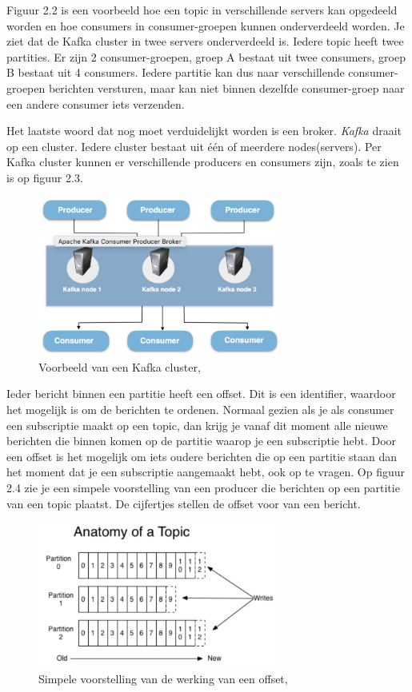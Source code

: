 Figuur 2.2 is een voorbeeld hoe een topic in verschillende servers kan opgedeeld worden en hoe consumers in consumer-groepen kunnen onderverdeeld worden. Je ziet dat de Kafka cluster in twee servers onderverdeeld is. Iedere topic heeft twee partities. Er zijn 2 consumer-groepen, groep A bestaat uit twee consumers, groep B bestaat uit 4 consumers. Iedere partitie kan dus naar verschillende consumer-groepen berichten versturen, maar kan niet binnen dezelfde consumer-groep naar een andere consumer iets verzenden. 

Het laatste woord dat nog moet verduidelijkt worden is een broker. \emph{Kafka} draait op een cluster. Iedere cluster bestaat uit één of meerdere nodes(servers). Per Kafka cluster kunnen er verschillende producers en consumers zijn, zoals te zien is op figuur 2.3. 

\begin{figure}[h!]
    \centering
    \includegraphics[width=80mm]{../kafkaCluster.png}
    \caption{Voorbeeld van een Kafka cluster, \autocite{Johansson2016}}
    
\end{figure}


 Ieder bericht binnen een partitie heeft een offset. Dit is een identifier, waardoor het mogelijk is om de berichten te ordenen. Normaal gezien als je als consumer een subscriptie maakt op een topic, dan krijg je vanaf dit moment alle nieuwe berichten die binnen komen op de partitie waarop je een subscriptie hebt. Door een offset is het mogelijk om iets oudere berichten die op een partitie staan dan het moment dat je een subscriptie aangemaakt hebt, ook op te vragen. Op figuur 2.4 zie je een simpele voorstelling van een producer die berichten op een partitie van een topic plaatst. De cijfertjes stellen de offset voor van een bericht.
 \begin{figure}[h!]
     \centering
     \includegraphics[width=80mm]{../kafkaOffset.png}
     \caption{Simpele voorstelling van de werking van een offset, \autocite{Sookocheff2015}}
     
 \end{figure}


